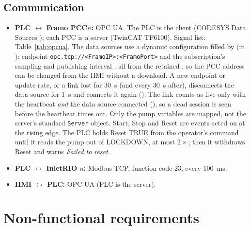 \documentclass[11pt,a4paper]{article}
\begin{document}
\subsection{Communication}
\begin{itemize}[nosep]
  \item \textbf{PLC $\leftrightarrow$ Framo PCC$n$:} OPC UA. The PLC is the client (CODESYS Data Sources
        ); each PCC is a server (TwinCAT TF6100). Signal list: Table~\ref{tab:opcua}.
        The data sources use a dynamic configuration filled by  (in ):
        endpoint \texttt{opc.tcp://<FramoIP>:<FramoPort>} and the subscription's sampling and publishing
        interval , all from the retained , so the PCC address can be
        changed from the HMI without a download. A new endpoint or update rate, or a link lost for 30~s
        (and every 30~s after), disconnects the data source for 1~s and connects it again
        (). The link counts as live only with the heartbeat \emph{and}
        the data source connected (), so a dead session is seen before
        the heartbeat times out. Only the pump variables are mapped, not the server's standard
        \texttt{Server} object.
        Start, Stop and Reset are events acted on at the rising edge. The PLC holds Reset TRUE
        from the operator's command until it reads the pump out of LOCKDOWN, at most
        $2\times$; then it withdraws Reset and warns \emph{Failed to reset}.
  \item \textbf{PLC $\leftrightarrow$ InletRIO $n$:} Modbus TCP, function code 23, every 100~ms.
  \item \textbf{HMI $\leftrightarrow$ PLC:} OPC UA (PLC is the server).
\end{itemize}

\section{Non-functional requirements}
\label{sec:nfreq}
\end{document}

